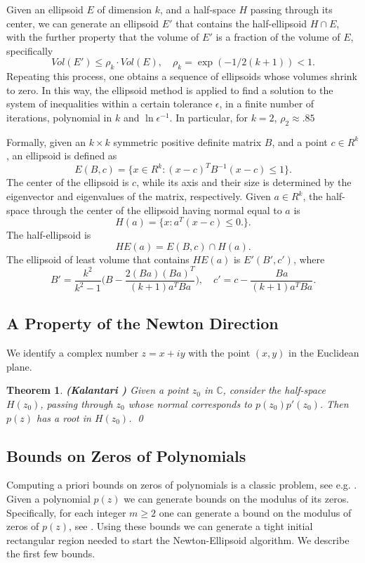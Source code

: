 \documentclass{article}
\newtheorem{theorem}{Theorem}
\begin{document}
Given  an ellipsoid $E$ of dimension $k$,  and a half-space $H$ passing through its center, we can generate an ellipsoid $E'$ that contains the half-ellipsoid $H \cap E$, with the further property that  the volume of $E'$ is a fraction of the volume of $E$, specifically
$$Vol(E') \leq \rho_k  \cdot Vol(E), \quad \rho_k = \exp(-1/2(k+1))<1 .$$
Repeating this process, one obtains a sequence of ellipsoids whose volumes shrink to zero.  In this way, the ellipsoid method is applied to find a solution to the system of inequalities within a certain tolerance $\epsilon$, in a finite number of iterations, polynomial in $k$ and $\ln \epsilon^{-1}$.  In particular, for $k=2$, $\rho_2 \approx .85$

Formally, given an $k \times k$  symmetric positive definite matrix $B$, and a point $c \in R^k$, an ellipsoid is defined as
$$E(B,c)= \{ x \in R^k :  (x-c)^T B^{-1} (x-c) \leq 1\}.$$
The center of the ellipsoid is $c$, while its axis and their size is determined by the eigenvector and eigenvalues of the matrix, respectively. Given $a \in R^k$, the half-space through the center of the ellipsoid having normal equal to $a$ is
$$H(a)=\{x: a^T(x -c) \leq 0. \}.$$
The half-ellipsoid is
$$HE(a)= E(B,c) \cap H(a).$$
The ellipsoid of least volume that contains $HE(a)$ is $E'(B',c')$, where
$$B'= \frac{k^2}{k^2-1} \bigg (B- \frac{2(Ba)(Ba)^T}{(k+1)a^TBa} \bigg ), \quad c'=c- \frac{Ba}{(k+1)a^TBa}.$$

\subsection{A Property of the Newton Direction}

We identify a complex number $z=x+iy$ with the point $(x,y)$ in the Euclidean plane.

\begin{theorem} \label{FTA} {\bf (Kalantari \cite{kalFTA})}
Given a point $z_0$ in $\mathbb{C}$, consider the half-space $H(z_0)$, passing through $z_0$ whose normal corresponds to ${p(z_0)}{p'(z_0)}$. Then $p(z)$ has a root in $H(z_0)$. \qed
\end{theorem}

\subsection{Bounds on Zeros of Polynomials}  Computing a priori bounds on zeros of polynomials is a classic problem, see e.g. \cite{mc2005}.  Given a polynomial $p(z)$ we can generate bounds on the modulus of its zeros. Specifically, for each integer  $m \geq 2$  one can generate a bound on the modulus of zeros of $p(z)$, see \cite{kalbound}. Using these bounds we can generate a tight initial rectangular region needed to start the Newton-Ellipsoid algorithm. We describe the first few bounds.
\end{document}
